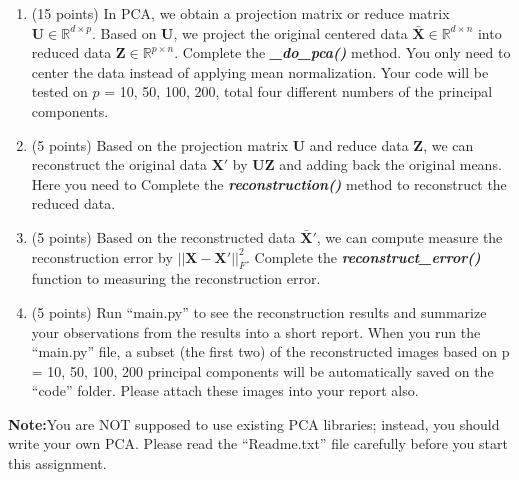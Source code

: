 \documentclass[11pt]{article}
\begin{document}
\begin{enumerate}
    \begin{enumerate}
    \item (15 points) In PCA, we obtain a projection matrix or
    reduce matrix $\boldsymbol U \in \mathbb{R}^{d\times p}$.
    Based on $\boldsymbol U$, we project the original centered
    data $\boldsymbol{\bar{X}} \in \mathbb{R}^{d\times n}$ into
    reduced data $\boldsymbol{Z} \in \mathbb{R}^{p\times n}$.
    Complete the \emph{\textbf{\_do\_pca()}} method. You only
    need to center the data instead of applying mean
    normalization. Your code will be tested on $p$ = 10, 50, 100,
    200, total four different numbers of the principal
    components.
    
    \item (5 points) Based on the projection matrix $\boldsymbol
    U$ and reduce data $\boldsymbol{Z}$, we can reconstruct the
    original data  $\boldsymbol{{X}'}$ by $\boldsymbol{U}
    \boldsymbol{Z}$ and adding back the original means. Here you
    need to  Complete the \emph{\textbf{reconstruction()}} method
    to reconstruct the reduced data.
    
    \item (5 points) Based on the reconstructed data
    $\boldsymbol{\bar{X}'}$, we can compute measure the
    reconstruction error by $||\boldsymbol X -
    \boldsymbol{{X}'}||^2_F$. Complete the
    \emph{\textbf{reconstruct\_error()}} function to measuring
    the reconstruction error.
    
    \item (5 points) Run ``main.py'' to see the reconstruction
    results and summarize your observations from the results into
    a short report. When you run the ``main.py'' file, a subset
    (the first two) of the reconstructed images based on p = 10,
    50, 100, 200 principal components will be automatically saved
    on the ``code'' folder. Please attach these images into your
    report also.
    \end{enumerate}
    
    
    \textbf{Note:}You are NOT supposed to use existing PCA libraries; instead, you should write your own PCA. Please read the ``Readme.txt'' file carefully before you start this assignment.

\end{enumerate}
\end{document}
